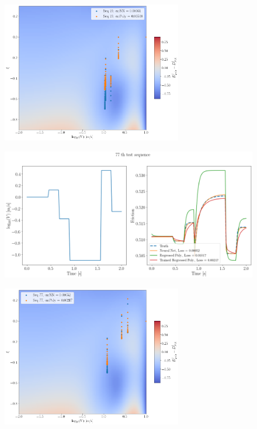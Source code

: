 \begin{figure}[H]
    \centering
    \includegraphics[width=0.7\textwidth]{images/Trial0216_errDdagger_seq19.png}
\end{figure}
\begin{figure}[H]
    \centering
    \includegraphics[width=1.0\textwidth]{images/polynomialRegressedTrainedSeq77.png}
\end{figure}
\begin{figure}[H]
    \centering
    \includegraphics[width=0.7\textwidth]{images/Trial0216_errDdagger_seq77.png}
\end{figure}
